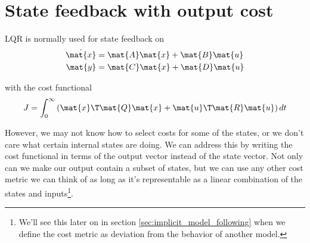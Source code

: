 \section{State feedback with output cost}

LQR is normally used for state feedback on
\begin{align*}
  \dot{\mat{x}} &= \mat{A}\mat{x} + \mat{B}\mat{u} \\
  \mat{y} &= \mat{C}\mat{x} + \mat{D}\mat{u}
\end{align*}

with the cost functional
\begin{equation*}
  J = \int_0^\infty \left(\mat{x}\T\mat{Q}\mat{x} +
    \mat{u}\T\mat{R}\mat{u}\right) dt
\end{equation*}

However, we may not know how to select costs for some of the states, or we don't
care what certain internal states are doing. We can address this by writing the
cost functional in terms of the output vector instead of the state vector. Not
only can we make our output contain a subset of states, but we can use any other
cost metric we can think of as long as it's representable as a linear
combination of the states and inputs\footnote{We'll see this later on in section
\ref{sec:implicit_model_following} when we define the cost metric as deviation
from the behavior of another model.}.

